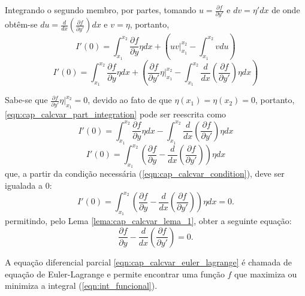 Integrando o segundo membro, por partes, tomando $u=\frac{\partial f}{\partial y'}$ e $dv=\eta'dx$ de onde obtêm-se $du=\frac{d}{dx}\left ( \frac{\partial f}{\partial y'} \right )dx$ e $v=\eta$, portanto,
$$
I'(0)=
	\int_{x_1}^{x_2} \frac{\partial f}{\partial y}\eta dx
	+
	\left (
	uv \Big|_{x_1}^{x_2} - \int_{x_1}^{x_2}vdu
	\right )
$$
\begin{equation}\label{eqn:cap_calcvar_part_integration}
I'(0)=
	\int_{x_1}^{x_2} \frac{\partial f}{\partial y}\eta dx
	+
	\left (
		\frac{\partial f}{\partial y'}\eta \Biggr|_{x_1}^{x_2} - \int_{x_1}^{x_2} \frac{d}{dx}\left ( \frac{\partial f}{\partial y'} \right ) \eta dx
	\right )
\end{equation}

Sabe-se que $\frac{\partial f}{\partial y'}\eta \Big |_{x_1}^{x_2}=0$, devido ao fato de que $\eta(x_1)=\eta(x_2)=0$, portanto, \eqref{eqn:cap_calcvar_part_integration} pode ser reescrita como
$$
I'(0)=
	\int_{x_1}^{x_2} \frac{\partial f}{\partial y}\eta dx
	-
	\int_{x_1}^{x_2} \frac{d}{dx} \left ( \frac{\partial f}{\partial y'} \right ) \eta dx
$$
$$
I'(0)=\int_{x_1}^{x_2}\left (
	\frac{\partial f}{\partial y} -
	\frac{d}{dx}
	\left (
		\frac{\partial f}{\partial y'}
	\right )
\right )\eta dx
$$
que, a partir da condição necessária (\ref{eqn:cap_calcvar_condition}), deve ser igualada a $0$:
$$
I'(0)=\int_{x_1}^{x_2}\left (
	\frac{\partial f}{\partial y} -
	\frac{d}{dx}
	\left (
		\frac{\partial f}{\partial y'}
	\right )
\right )\eta dx = 0	\text{.}
$$
permitindo, pelo Lema \ref{lema:cap_calcvar_lema_1}, obter a seguinte equação:
\begin{equation}\label{eqn:cap_calcvar_euler_lagrange}
\frac{\partial f}{\partial y} - \frac{d}{dx} \left ( \frac{\partial f}{\partial y'} \right )=0 \text{.}
\end{equation}

A equação diferencial parcial \eqref{eqn:cap_calcvar_euler_lagrange} é chamada de equação de Euler-Lagrange e permite encontrar uma função $f$ que maximiza ou minimiza a integral (\ref{eqn:int_funcional}).




